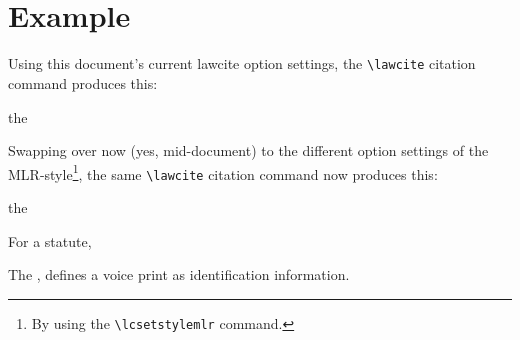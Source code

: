 
\lcsetdemoon
\maketitle
\begin{abstract}
\myabstracttext
\end{abstract}
\vfill{\ack}
\newpage
\tableofcontents
\bigskip
\hfill{}\hfill\ %
\listoffigures
\listoftables
\bigskip
\hfill{}\hfill\ %
\bigskip
\newpage
\iftoggle{printlegtoc}{%
\let\oldtwocolumn\twocolumn
\renewcommand{\twocolumn}[1][]{#1}
\let\oldclearpage\clearpage
\renewcommand\clearpage{\relax}
\printindex[cases]
\printindex[legislation]
\iftoggle{printregulations}{\printindex[regulations]}{}
\renewcommand{\twocolumn}[1][]{\oldtwocolumn}
\renewcommand\clearpage{\oldclearpage}
}{}
\bigskip
\hfill{}\hfill\ %
\bigskip


\newpage
\section{Example}
Using this document's current lawcite option settings, the \texttt{\textbackslash lawcite} citation command produces this:

\begin{mdframed}[default]
the 
\end{mdframed}
\bigskip
Swapping over now (yes, mid-document) to the different option settings of the MLR-style\footnote{By using the \texttt{\textbackslash lcsetstylemlr} command.}, the same \texttt{\textbackslash lawcite} citation command now produces this:

\lcsetstylemlr
\begin{mdframed}[default]
the  
\end{mdframed}
\bigskip
\lcsetstyledefault

For a statute, 

\begin{mdframed}[default]
The , defines a voice print as identification information.
\end{mdframed}
\bigskip


